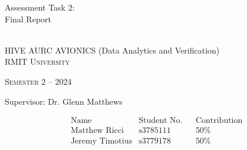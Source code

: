 \documentclass[a4paper, oneside]{memoir}
\newcommand*{\semester}[2]{Semester #1 -- #2} %
\newcommand*{\student}[3]{&\text{#1} &\text{#2} &&\text{#3}} %
\newcommand*{\titleAM}[4]%
{\begingroup
  \centering
  {\Huge Assessment Task #2:\\#3\par}\\[\baselineskip]
  {\Large HIVE AURC AVIONICS (Data Analytics and Verification)}\\[\baselineskip]
  {\small\scshape RMIT University}\par
  {\small\scshape #4}\par\vspace{0.5em}
  {\large Supervisor: #1}\par\vspace{0.5em}
  \endgroup}
\begin{document}
  \titleAM{Dr. Glenn Matthews}{2}{Final Report}{\semester{2}{2024}}
  \begin{align*}
    &\text{Name} &\text{Student No.} &&\text{Contribution}\\
    \student{Matthew Ricci}{s3785111}{50\%}\\
    \student{Jeremy Timotius}{s3779178}{50\%}
  \end{align*}

  \clearpage
  \noindent{}
  \vspace{2.5em}
  \tableofcontents*
  \vfill
  \noindent{}
  \thispagestyle{empty}
  \clearpage

  \markboth{}{}
  

  \clearpage
  
\end{document}
